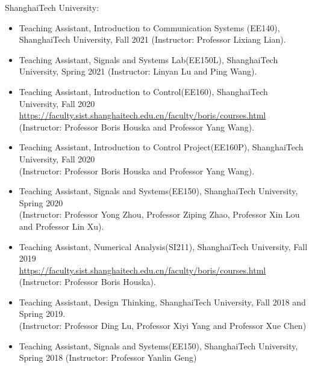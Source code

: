 \documentclass[paper=a4,fontsize=11pt]{scrartcl} %
\newlength{\spacebox}
\newcommand{\PersonalEntry}[2]{
		\noindent\hangindent=2em\hangafter=0 %
		\parbox{\spacebox}{        %
		\textit{#1}}		       %
		\hspace{1.5em} #2 \par}    %
\newcommand{\SkillsEntry}[2]{      %
		\noindent\hangindent=2em\hangafter=0 %
		\parbox{\spacebox}{        %
		\textit{#1}}			   %
		\hspace{1.5em} #2 \par}    %
\begin{document}
ShanghaiTech University:
\begin{itemize}
	
	
	\item{Teaching Assistant, 	Introduction to Communication Systems (EE140), ShanghaiTech University, Fall 2021 (Instructor: Professor Lixiang Lian).}
	
	\item{Teaching Assistant, Signals and Systems Lab(EE150L), ShanghaiTech University, Spring 2021 (Instructor: Linyan Lu and Ping Wang).}
	
	\item{Teaching Assistant, Introduction to Control(EE160), ShanghaiTech University, Fall 2020\\ 
		\url{https://faculty.sist.shanghaitech.edu.cn/faculty/boris/courses.html}\\
		(Instructor: Professor Boris Houska and Professor Yang Wang).
	}
	
	\item{Teaching Assistant, Introduction to Control Project(EE160P), ShanghaiTech University, Fall 2020\\ (Instructor: Professor Boris Houska and Professor Yang Wang).}
	
	\item{Teaching Assistant, Signals and Systems(EE150),  ShanghaiTech University, Spring 2020 \\ (Instructor: Professor Yong Zhou, Professor Ziping Zhao, Professor Xin Lou and Professor Lin Xu).}
	
	\item{Teaching Assistant, Numerical Analysis(SI211), ShanghaiTech University, Fall 2019\\ 
		\url{https://faculty.sist.shanghaitech.edu.cn/faculty/boris/courses.html}\\
		(Instructor: Professor Boris Houska).
	}
	
	\item{Teaching Assistant, Design Thinking, ShanghaiTech University, Fall 2018 and Spring 2019.\\ (Instructor: Professor Ding Lu, Professor Xiyi Yang and Professor Xue Chen) }
	
	\item{Teaching Assistant, Signals and Systems(EE150),  ShanghaiTech University, Spring 2018 (Instructor: Professor Yanlin Geng)
		
		}


	
\end{itemize}
\end{document}

